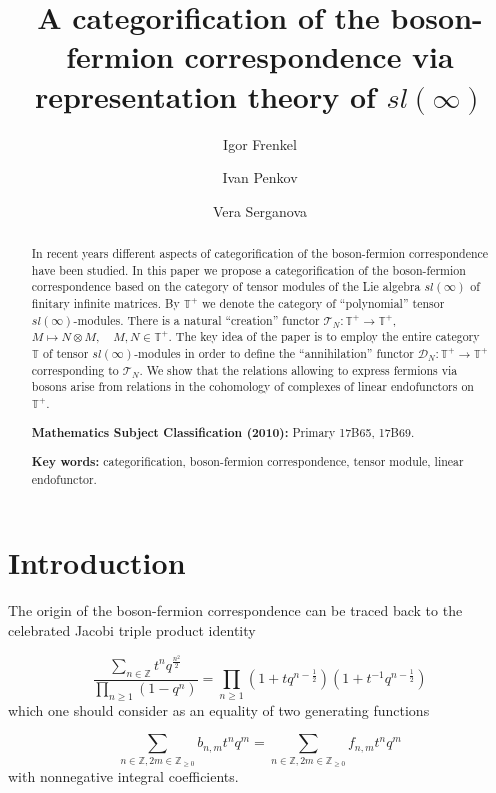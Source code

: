 \documentclass[11pt]{amsart}
\title{A categorification of the boson-fermion correspondence via representation theory of $sl(\infty)$}
\author[Igor Frenkel]{\;Igor Frenkel}
\author[Ivan Penkov]{\;Ivan Penkov}
\author[Vera Serganova]{\;Vera Serganova}
\newcommand {\ZZ} {\mathbb {Z}}
\begin{document}
\maketitle
\begin{abstract} In recent years different aspects of categorification of the boson-fermion correspondence
have been studied. In this paper we propose a categorification of the boson-fermion correspondence based on
the category of tensor modules of the Lie algebra $sl(\infty)$ of finitary infinite matrices. By $\mathbb T^+$ we denote
the category of ``polynomial'' tensor  $sl(\infty)$-modules. There is a natural ``creation'' functor $\mathcal T_N: \mathbb T^+\to \mathbb T^+$,
$M\mapsto N\otimes M,\quad M,N\in \mathbb T^+$. The key idea of the paper is to employ the entire category $\mathbb T$ of tensor $sl(\infty)$-modules
in order to define the ``annihilation'' functor $\mathcal D_N: \mathbb T^+\to \mathbb T^+$ corresponding to $\mathcal T_N$.
We show that the relations allowing to express fermions via bosons arise from relations in the cohomology of complexes of linear endofunctors on $\mathbb T^+$. 

\textbf{Mathematics Subject Classification (2010):} Primary 17B65, 17B69. 
 
\textbf{Key words:} categorification, boson-fermion correspondence, tensor module, linear endofunctor.
\end{abstract}
\section {Introduction}

The origin of the boson-fermion correspondence can be traced back to the celebrated 
Jacobi triple product identity

\begin{equation}\label{Jacobi}
  \frac{\sum_{n \in \ZZ}t^nq^\frac{n^2}{2}}{\prod_{n \geq 1}(1-q^n)} = \prod_{n \geq 1} (1+tq^{n-\frac{1}{2}})(1+t^{-1}q^{n-\frac{1}{2}})
\end{equation}
which one should consider as an equality of two generating functions

\begin{equation}\label{Jacgenf}
 \sum_{n \in \ZZ, 2m \in\ZZ_{\geq 0}} b_{n,m} t^nq^m = \sum_{n \in \ZZ, 2m \in\ZZ_{\geq 0}} f_{n,m} t^nq^m\nonumber
\end{equation}
with nonnegative integral coefficients.
\end{document}
